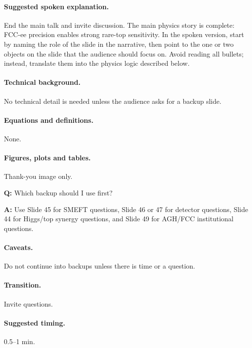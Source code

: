 \documentclass[11pt,a4paper]{report}
\begin{document}
\paragraph{Suggested spoken explanation.}
End the main talk and invite discussion. The main physics story is complete: FCC-ee precision enables strong rare-top sensitivity. In the spoken version, start by naming the role of the slide in the narrative, then point to the one or two objects on the slide that the audience should focus on.  Avoid reading all bullets; instead, translate them into the physics logic described below.

\paragraph{Technical background.}
No technical detail is needed unless the audience asks for a backup slide.

\paragraph{Equations and definitions.}
None.

\paragraph{Figures, plots and tables.}
Thank-you image only.

\begin{questionbox}
\textbf{Q:} Which backup should I use first?\par
\textbf{A:} Use Slide 45 for SMEFT questions, Slide 46 or 47 for detector questions, Slide 44 for Higgs/top synergy questions, and Slide 49 for AGH/FCC institutional questions.
\end{questionbox}

\paragraph{Caveats.}
Do not continue into backups unless there is time or a question.

\paragraph{Transition.}
Invite questions.

\paragraph{Suggested timing.}
0.5--1 min.
\end{document}
